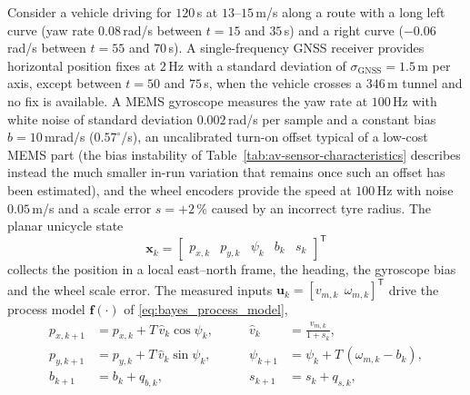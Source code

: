\begin{example}
\label{ex:gnss-imu-odom}
Consider a vehicle driving for $120$\,s at $13$--$15$\,m/s along a route with a long left curve (yaw rate $0.08$\,rad/s between $t=15$ and $35$\,s) and a right curve ($-0.06$\,rad/s between $t=55$ and $70$\,s). A single-frequency GNSS receiver provides horizontal position fixes at $2$\,Hz with a standard deviation of $\sigma_{\mathrm{GNSS}}=1.5$\,m per axis, except between $t=50$ and $75$\,s, when the vehicle crosses a $346$\,m tunnel and no fix is available. A MEMS gyroscope measures the yaw rate at $100$\,Hz with white noise of standard deviation $0.002$\,rad/s per sample and a constant bias $b=10$\,mrad/s ($0.57^{\circ}$/s), an uncalibrated turn-on offset typical of a low-cost MEMS part (the bias instability of Table~\ref{tab:av-sensor-characteristics} describes instead the much smaller in-run variation that remains once such an offset has been estimated), and the wheel encoders provide the speed at $100$\,Hz with noise $0.05$\,m/s and a scale error $s=+2$\,\% caused by an incorrect tyre radius. The planar unicycle state
\begin{equation}
\mathbf{x}_{k}=
\begin{bmatrix}
p_{x,k} & p_{y,k} & \psi_{k} & b_{k} & s_{k}
\end{bmatrix}^{\mathsf T}
\end{equation}
collects the position in a local east--north frame, the heading, the gyroscope bias and the wheel scale error. The measured inputs $\mathbf{u}_{k}=[v_{m,k}\ \ \omega_{m,k}]^{\mathsf T}$ drive the process model $\mathbf{f}(\cdot)$ of \eqref{eq:bayes_process_model},
\begin{equation}
\begin{aligned}
p_{x,k+1}&=p_{x,k}+T\,\hat v_{k}\cos\psi_{k}, &\qquad \hat v_{k}&=\frac{v_{m,k}}{1+s_{k}},\\
p_{y,k+1}&=p_{y,k}+T\,\hat v_{k}\sin\psi_{k}, &\qquad \psi_{k+1}&=\psi_{k}+T\,(\omega_{m,k}-b_{k}),\\
b_{k+1}&=b_{k}+q_{b,k}, &\qquad s_{k+1}&=s_{k}+q_{s,k},
\end{aligned}
\label{eq:gnss-imu-process}
\end{equation}

\end{example}
